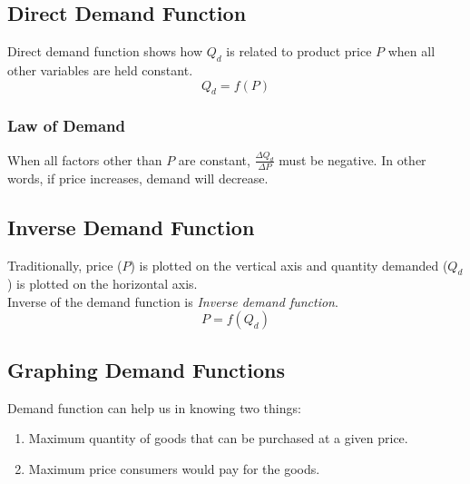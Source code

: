 \documentclass[oneside]{book}
\begin{document}
\subsection{Direct Demand Function}
Direct demand function shows how \(Q_d\) is related to product price \(P\) when all other variables are held constant.
\[
	Q_d = f(P)
\]
\subsubsection{Law of Demand}
When all factors other than \(P\) are constant, \(\displaystyle \frac{\Delta Q_d}{\Delta P}\) must be negative. In other words, if price increases, demand will decrease.

\subsection{Inverse Demand Function}
Traditionally, price (\(P\)) is plotted on the vertical axis and quantity demanded (\(Q_d\)) is plotted on the horizontal axis.\\
Inverse of the demand function is \textit{Inverse demand function}.
\[
	P = f(Q_d)
\]

\subsection{Graphing Demand Functions}
Demand function can help us in knowing two things:
\begin{enumerate}
	\item Maximum quantity of goods that can be purchased at a given price.
	\item Maximum price consumers would pay for the goods.
\end{enumerate}



\end{document}
